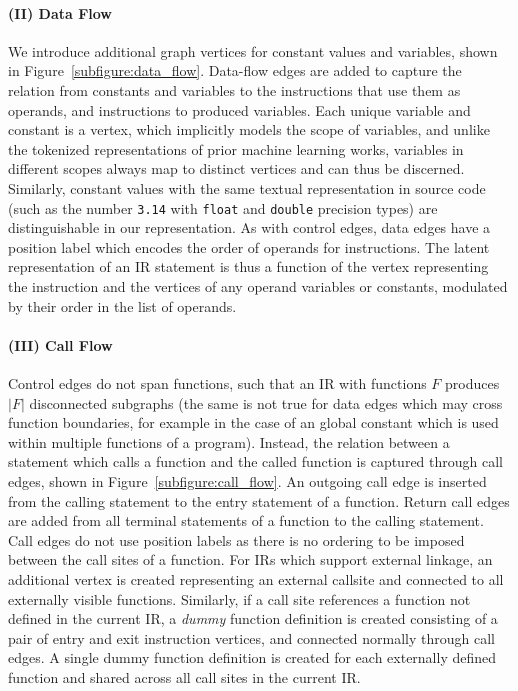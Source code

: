 \paragraph{(II) Data Flow} We introduce additional graph vertices for
constant values and variables, shown in
Figure~\ref{subfigure:data_flow}. Data-flow edges are added to capture
the relation from constants and variables to the instructions that use
them as operands, and instructions to produced variables. Each unique
variable and constant is a vertex, which implicitly models the scope
of variables, and unlike the tokenized representations of prior
machine learning works, variables in different scopes always map to
distinct vertices and can thus be discerned. Similarly, constant
values with the same textual representation in source code (such as
the number \texttt{3.14} with \texttt{float} and \texttt{double}
precision types) are distinguishable in our representation. As with
control edges, data edges have a position label which encodes the
order of operands for instructions. The latent representation of an IR
statement is thus a function of the vertex representing the
instruction and the vertices of any operand variables or constants,
modulated by their order in the list of operands.

\paragraph{(III) Call Flow} Control edges do not span functions, such
that an IR with functions $F$ produces $|F|$ disconnected subgraphs
(the same is not true for data edges which may cross function
boundaries, for example in the case of an global constant which is
used within multiple functions of a program). Instead, the relation
between a statement which calls a function and the called function is
captured through call edges, shown in
Figure~\ref{subfigure:call_flow}. An outgoing call edge is inserted
from the calling statement to the entry statement of a
function. Return call edges are added from all terminal statements of
a function to the calling statement. Call edges do not use position
labels as there is no ordering to be imposed between the call sites of
a function. For IRs which support external linkage, an additional
vertex is created representing an external callsite and connected to
all externally visible functions. Similarly, if a call site references
a function not defined in the current IR, a \emph{dummy} function
definition is created consisting of a pair of entry and exit
instruction vertices, and connected normally through call edges. A
single dummy function definition is created for each externally
defined function and shared across all call sites in the current IR.



